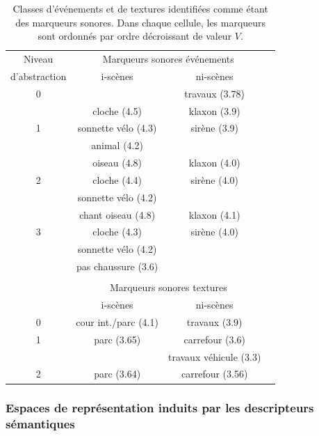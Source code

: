 \documentclass[twoside,twocolumn]{article}
\begin{document}
\begin{table}[t]
 \setlength{\tabcolsep}{0.2pt}
 \centering
  {\renewcommand{\arraystretch}{0.9}
\begin{tabular}{c c c c} 
Niveau        & \multicolumn{2}{c}{Marqueurs sonores événements} \\
d'abstraction & i-scènes & ni-scènes \\
\hline
0  &                          & travaux (3.78)  \\
\hline
  & cloche  (4.5)             & klaxon  (3.9) \\
1 & sonnette vélo  (4.3)      & sirène (3.9)\\
  & animal (4.2)              &       \\
   \hline
  & oiseau        (4.8)       & klaxon  (4.0)\\
2 & cloche  (4.4)             & sirène (4.0)\\
  & sonnette vélo    (4.2)             &       \\
   \hline
  & chant oiseau (4.8)        & klaxon  (4.1)\\
3 & cloche   (4.3)            & sirène (4.0)\\
  & sonnette vélo     (4.2)   &       \\
  & pas chaussure  (3.6)      &  \\
  &                           & \\ 
  & \multicolumn{2}{c}{Marqueurs sonores textures}      \\
  & i-scènes & ni-scènes \\
\hline
0 &     cour int./parc (4.1) &  travaux (3.9)  \\
\hline
1 &     parc (3.65)          &  carrefour (3.6)  \\
  &                          &  travaux véhicule (3.3)  \\
\hline
2 &     parc (3.64)          &  carrefour (3.56)  \\
\hline
\end{tabular}
} 
\vspace{0.5mm}
\caption{Classes d'événements et de textures identifiées comme étant des marqueurs sonores. Dans chaque cellule, les marqueurs sont ordonnés par ordre décroissant de valeur $V$.}
\label{tab:markers}
\end{table}

\subsubsection*{Espaces de représentation induits par les descripteurs sémantiques}
\end{document}

